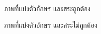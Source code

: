 \documentclass[12pt,oneside,openright,a4paper]{cpe-thai-project}
\begin{document}
    \begin{figure}[!h]\centering
     \setlength{\fboxrule}{0.2mm} %
     \setlength{\fboxsep}{1cm}
     \caption{ภาพที่แบ่งตัวอักษร และสระถูกต้อง}\label{fig:system}                  
    \end{figure}
    \begin{figure}[!h]\centering
     \setlength{\fboxrule}{0.2mm} %
     \setlength{\fboxsep}{1cm}
     \caption{ภาพที่แบ่งตัวอักษร และสระไม่ถูกต้อง}\label{fig:system}                  
    \end{figure}
\newpage
\end{document}
